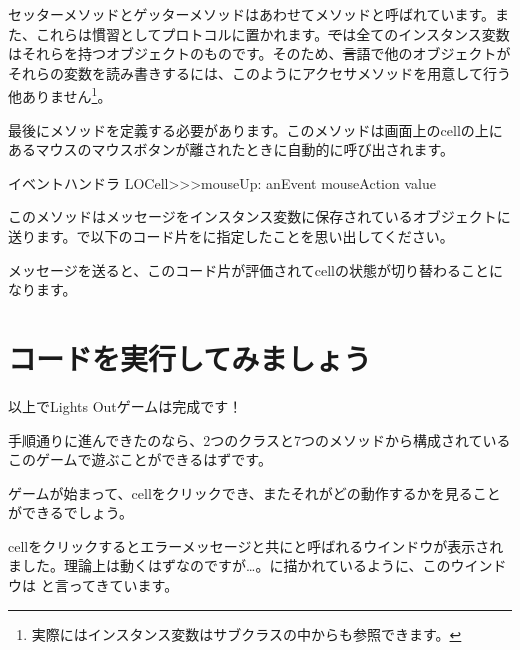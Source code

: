 \documentclass[a4paper,10pt,twoside]{book}
\begin{document}
セッターメソッドとゲッターメソッドはあわせてメソッドと呼ばれています。また、これらは慣習としてプロトコルに置かれます。\st では全てのインスタンス変数はそれらを持つオブジェクトのものです。そのため、\st 言語で他のオブジェクトがそれらの変数を読み書きするには、このようにアクセサメソッドを用意して行う他ありません\footnote{実際にはインスタンス変数はサブクラスの中からも参照できます。}。


最後にメソッドを定義する必要があります。このメソッドは画面上のcellの上にあるマウスのマウスボタンが離されたときに自動的に呼び出されます。

\begin{method}[sbecellmouseup]{イベントハンドラ}
LOCell>>>mouseUp: anEvent
   mouseAction value
\end{method}



このメソッドはメッセージをインスタンス変数に保存されているオブジェクトに送ります。で以下のコード片をに指定したことを思い出してください。


\noindent
{}メッセージを送ると、このコード片が評価されてcellの状態が切り替わることになります。

\section{コードを実行してみましょう}

以上でLights Outゲームは完成です！

手順通りに進んできたのなら、2つのクラスと7つのメソッドから構成されているこのゲームで遊ぶことができるはずです。


ゲームが始まって、cellをクリックでき、またそれがどの動作するかを見ることができるでしょう。

cellをクリックするとエラーメッセージと共にと呼ばれるウインドウが表示されました。理論上は動くはずなのですが\ldots{}。に描かれているように、このウインドウは と言ってきています。
\end{document}
